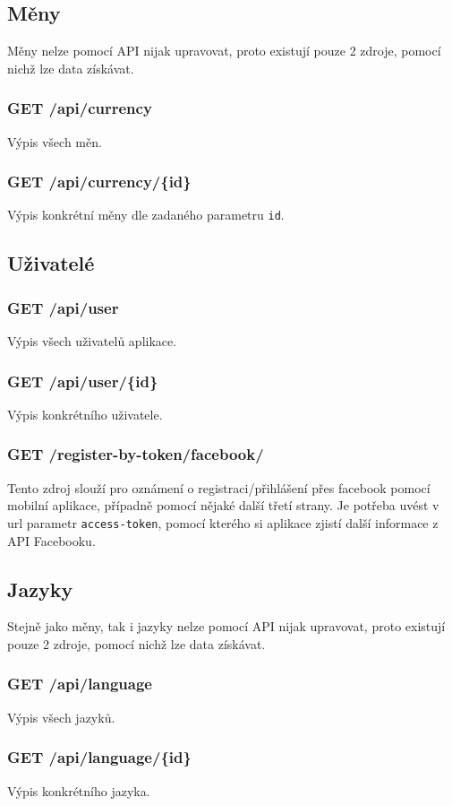 \subsection{Měny}
Měny nelze pomocí API nijak upravovat, proto existují pouze 2 zdroje, pomocí nichž lze data získávat.
\subsubsection{GET /api/currency}
Výpis všech měn.
\subsubsection{GET /api/currency/\{id\}}
Výpis konkrétní měny dle zadaného parametru \texttt{id}.

\subsection{Uživatelé}
\subsubsection{GET /api/user}
Výpis všech uživatelů aplikace.
\subsubsection{GET /api/user/\{id\}}
Výpis konkrétního uživatele.
\subsubsection{GET /register-by-token/facebook/}
Tento zdroj slouží pro oznámení o registraci/přihlášení přes facebook pomocí mobilní aplikace, případně pomocí nějaké další třetí strany. Je potřeba uvést v url parametr \texttt{access-token}, pomocí kterého si aplikace zjistí další informace z API Facebooku.

\subsection{Jazyky}
Stejně jako měny, tak i jazyky nelze pomocí API nijak upravovat, proto existují pouze 2 zdroje, pomocí nichž lze data získávat.
\subsubsection{GET /api/language}
Výpis všech jazyků.
\subsubsection{GET /api/language/\{id\}}
Výpis konkrétního jazyka.

